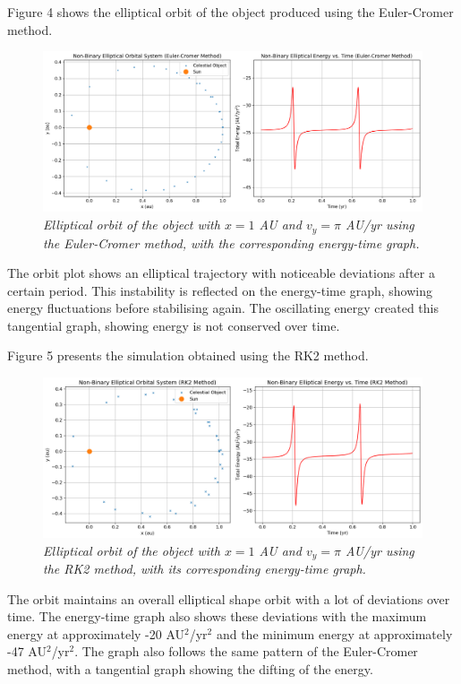 \documentclass[11 pt, a4paper, twocolumn]{article}
\begin{document}
Figure 4 shows the elliptical orbit of the object produced using the Euler-Cromer method.
\begin{figure}[H]
  \includegraphics[width=1\linewidth]{Euler cromer/eulercromerelliptic.png}
  \centering
  \caption{\textit{Elliptical orbit of the object with $x = 1$ AU and $v_y = \pi$ AU/yr using the 
  Euler-Cromer method, with the corresponding energy-time graph.}} 
\end{figure}
\vspace{-1.5em}
The orbit plot shows an elliptical trajectory with noticeable deviations after a certain period. This
instability is reflected on the energy-time graph, showing energy fluctuations before stabilising again.
The oscillating energy created this tangential graph, showing energy is not conserved over time.

Figure 5 presents the simulation obtained using the RK2 method.
\begin{figure}[H]
  \includegraphics[width=1\linewidth]{RK2/rk2elliptic.png}
  \centering
  \caption{\textit{Elliptical orbit of the object with $x = 1$ AU and $v_y = \pi$ AU/yr using the RK2 
  method, with its corresponding energy-time graph.}} 
\end{figure}
\vspace{-1.5em}
The orbit maintains an overall elliptical shape orbit with a lot of deviations over time. The 
energy-time graph also shows these deviations with the maximum energy at approximately 
-20 AU$^2$/yr$^2$ and the minimum energy at approximately -47 AU$^2$/yr$^2$. The graph also follows the same pattern of the 
Euler-Cromer method, with a tangential graph showing the difting of the energy.
\end{document}
